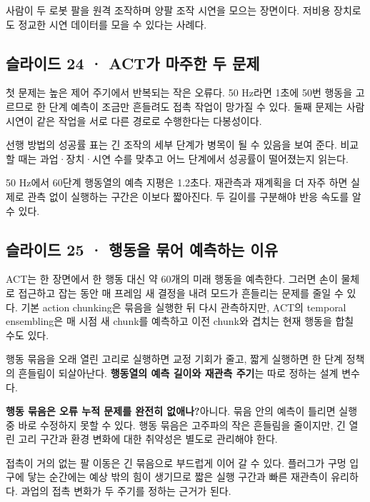 \documentclass[11pt,a4paper]{article}
\begin{document}
사람이 두 로봇 팔을 원격 조작하며 양팔 조작 시연을 모으는 장면이다. 저비용 장치로도 정교한 시연 데이터를 모을 수 있다는 사례다.\par

\subsection{슬라이드 24 · ACT가 마주한 두 문제}

첫 문제는 높은 제어 주기에서 반복되는 작은 오류다. 50 Hz라면 1초에 50번 행동을 고르므로 한 단계 예측이 조금만 흔들려도 접촉 작업이 망가질 수 있다. 둘째 문제는 사람 시연이 같은 작업을 서로 다른 경로로 수행한다는 다봉성이다.\par

선행 방법의 성공률 표는 긴 조작의 세부 단계가 병목이 될 수 있음을 보여 준다. 비교할 때는 과업·장치·시연 수를 맞추고 어느 단계에서 성공률이 떨어졌는지 읽는다.\par

50 Hz에서 60단계 행동열의 예측 지평은 1.2초다. 재관측과 재계획을 더 자주 하면 실제로 관측 없이 실행하는 구간은 이보다 짧아진다. 두 길이를 구분해야 반응 속도를 알 수 있다.\par

\subsection{슬라이드 25 · 행동을 묶어 예측하는 이유}

ACT는 한 장면에서 한 행동 대신 약 60개의 미래 행동을 예측한다. 그러면 손이 물체로 접근하고 잡는 동안 매 프레임 새 결정을 내려 모드가 흔들리는 문제를 줄일 수 있다. 기본 action chunking은 묶음을 실행한 뒤 다시 관측하지만, ACT의 temporal ensembling은 매 시점 새 chunk를 예측하고 이전 chunk와 겹치는 현재 행동을 합칠 수도 있다.\par

행동 묶음을 오래 열린 고리로 실행하면 교정 기회가 줄고, 짧게 실행하면 한 단계 정책의 흔들림이 되살아난다. \textbf{행동열의 예측 길이와 재관측 주기}는 따로 정하는 설계 변수다.\par

\par\medskip\noindent\textbf{행동 묶음은 오류 누적 문제를 완전히 없애나?}\quad 아니다. 묶음 안의 예측이 틀리면 실행 중 바로 수정하지 못할 수 있다. 행동 묶음은 고주파의 작은 흔들림을 줄이지만, 긴 열린 고리 구간과 환경 변화에 대한 취약성은 별도로 관리해야 한다.\par

접촉이 거의 없는 팔 이동은 긴 묶음으로 부드럽게 이어 갈 수 있다. 플러그가 구멍 입구에 닿는 순간에는 예상 밖의 힘이 생기므로 짧은 실행 구간과 빠른 재관측이 유리하다. 과업의 접촉 변화가 두 주기를 정하는 근거가 된다.\par
\end{document}
